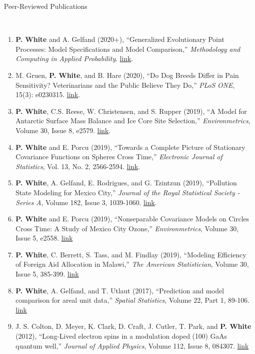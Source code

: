 \documentclass[12pt]{article}
\newcommand{\head}[1]{ %
    \bigskip %
    \begin{large}\begin{bf}{#1}\end{bf}\end{large} %

    \ \\ [-1.3cm] %

    \hrulefill}
\begin{document}
\vspace{2mm}
\head{Peer-Reviewed Publications}

\begin{enumerate}[label=$\bullet$]
\item \textbf{P. White} and A. Gelfand (2020+), ``Generalized Evolutionary Point Processes: Model Specifications and Model Comparison,'' \emph{Methodology and Computing in Applied Probability}. \href{https://doi.org/10.1007/s11009-020-09797-8}{link}.
\item M. Gruen, \textbf{P. White}, and B. Hare (2020), ``Do Dog Breeds Differ in Pain Sensitivity? Veterinarians and the Public Believe They Do,'' \emph{PLoS ONE}, 15(3): e0230315. \href{https://doi.org/10.1371/journal.pone.0230315}{link}.
\item \textbf{P. White}, C.S. Reese, W. Christensen, and S. Rupper (2019), ``A Model for Antarctic Surface Mass Balance and Ice Core Site Selection,'' \emph{Environmetrics}, Volume 30, Issue 8, e2579. \href{https://onlinelibrary.wiley.com/doi/abs/10.1002/env.2579}{link}.
\item \textbf{P. White} and E. Porcu (2019), ``Towards a Complete Picture of Stationary Covariance Functions on Spheres Cross Time,'' \emph{Electronic Journal of Statistics}, Vol. 13, No. 2, 2566-2594. \href{https://doi.org/10.1214/19-EJS1593}{link}.
\item \textbf{P. White}, A. Gelfand, E. Rodrigues, and G. Tzintzun (2019), ``Pollution State Modeling for Mexico City,'' \emph{Journal of the Royal Statistical Society - Series A}, Volume 182, Issue 3, 1039-1060. \href{https://rss.onlinelibrary.wiley.com/doi/abs/10.1111/rssa.12444}{link}.
\item \textbf{P. White} and E. Porcu (2019), ``Nonseparable Covariance Models on Circles Cross Time: A Study of Mexico City Ozone,'' \emph{Environmetrics}, Volume 30, Issue 5, e2558. \href{https://onlinelibrary.wiley.com/doi/full/10.1002/env.2558}{link}
\item \textbf{P. White}, C. Berrett, S. Tass, and M. Findlay (2019), ``Modeling Efficiency of Foreign Aid Allocation in Malawi,'' \emph{The American Statistician}, Volume 30, Issue 5, 385-399.  \href{https://www.tandfonline.com/doi/full/10.1080/00031305.2018.1470032}{link}
\item \textbf{P. White}, A. Gelfand, and T. Utlaut (2017), ``Prediction and model comparison for areal unit data,'' \emph{Spatial Statistics}, Volume 22, Part 1, 89-106. \href{http://www.sciencedirect.com/science/article/pii/S2211675317301422}{link}
\item J. S. Colton, D. Meyer, K. Clark, D. Craft, J. Cutler, T. Park, and \textbf{P. White} (2012), ``Long-Lived electron spins in a modulation doped (100) GaAs quantum well,'' \emph{Journal of Applied Physics}, Volume 112, Issue 8, 084307.  \href{http://aip.scitation.org/doi/abs/10.1063/1.4759320}{link}
\end{enumerate}
\end{document}
